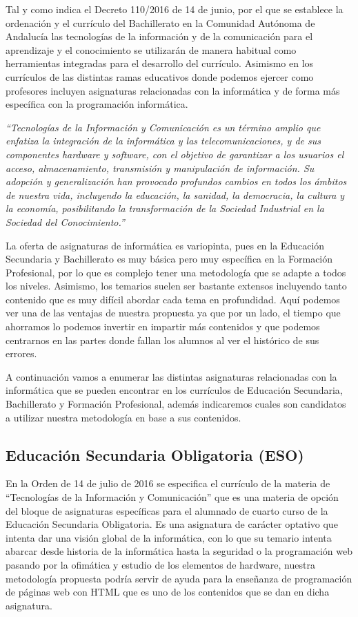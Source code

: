 Tal y como indica el Decreto 110/2016  de 14 de junio, por el que se establece la ordenación y el currículo del Bachillerato en la Comunidad Autónoma de Andalucía las tecnologías de la información y de la comunicación para el aprendizaje y el conocimiento se utilizarán de manera habitual como herramientas integradas para el desarrollo del currículo. Asimismo en los currículos de las distintas ramas educativos donde podemos ejercer como profesores incluyen asignaturas relacionadas con la informática y de forma más específica con la programación informática.


\bigskip
\textit{``Tecnologías de la Información y Comunicación es un término amplio que enfatiza la integración de la informática y las telecomunicaciones, y de sus componentes hardware y software, con el objetivo de garantizar a los usuarios el acceso, almacenamiento, transmisión y manipulación de información. Su adopción y generalización han provocado profundos cambios en todos los ámbitos de nuestra vida, incluyendo la educación, la sanidad, la democracia, la cultura y la economía, posibilitando la transformación de la Sociedad Industrial en la Sociedad del Conocimiento.''} \cite{junta_de_andalucia_decreto_2016}

\bigskip
La oferta de asignaturas de informática es variopinta, pues en la Educación Secundaria y Bachillerato es muy básica pero muy específica en la Formación Profesional, por lo que es complejo tener una metodología que se adapte a todos los niveles. Asimismo, los temarios suelen ser bastante extensos incluyendo tanto contenido que es muy difícil abordar cada tema en profundidad. Aquí podemos ver una de las ventajas de nuestra propuesta ya que por un lado, el tiempo que ahorramos lo podemos invertir en impartir más contenidos y que podemos centrarnos en las partes donde fallan los alumnos al ver el histórico de sus errores.

\bigskip
A continuación vamos a enumerar las distintas asignaturas relacionadas con la informática que se pueden encontrar en los currículos de Educación Secundaria, Bachillerato y Formación Profesional, además indicaremos cuales son candidatos a utilizar nuestra metodología en base a sus contenidos.

\subsection {Educación Secundaria Obligatoria (ESO)}

En la Orden de 14 de julio de 2016 se especifica el currículo de la materia de ``Tecnologías de la Información y Comunicación'' que es una materia de opción del bloque de asignaturas específicas para el alumnado de cuarto curso de la Educación Secundaria Obligatoria. Es una asignatura de carácter optativo que intenta dar una visión global de la informática, con lo que su temario intenta abarcar desde historia de la informática hasta la seguridad o la programación web pasando por la ofimática y estudio de los elementos de hardware, nuestra metodología propuesta podría servir de ayuda para la enseñanza de programación de páginas web con HTML que es uno de los contenidos que se dan en dicha asignatura.

